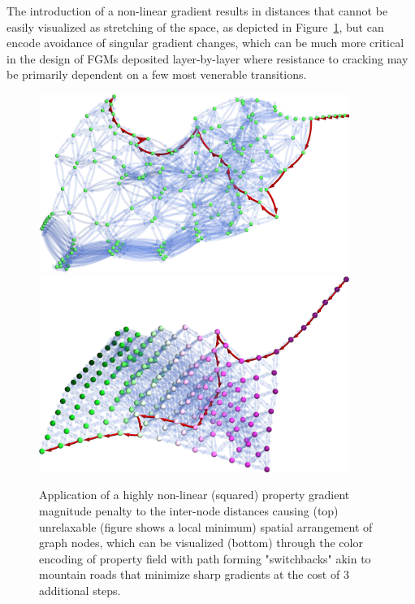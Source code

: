 The introduction of a non-linear gradient results in distances that cannot be easily visualized as stretching of the space, as depicted in Figure~\ref{pathplan:fig:lowgradientsquared}, but can encode avoidance of singular gradient changes, which can be much more critical in the design of FGMs deposited layer-by-layer where resistance to cracking may be primarily dependent on a few most venerable transitions.

\begin{figure}[H]
    \centering
    \includegraphics[width=0.9\textwidth]{pathplanning/InfeasibilityGliding_LowGradientSquared.png}
    \includegraphics[width=0.9\textwidth]{pathplanning/InfeasibilityGliding_LowGradientSquaredColored.png}
    \caption{Application of a highly non-linear (squared) property gradient magnitude penalty to the inter-node distances causing (top) unrelaxable (figure shows a local minimum) spatial arrangement of graph nodes, which can be visualized (bottom) through the color encoding of property field with path forming "switchbacks" akin to mountain roads that minimize sharp gradients at the cost of 3 additional steps.}
    \label{pathplan:fig:lowgradientsquared}
\end{figure}

